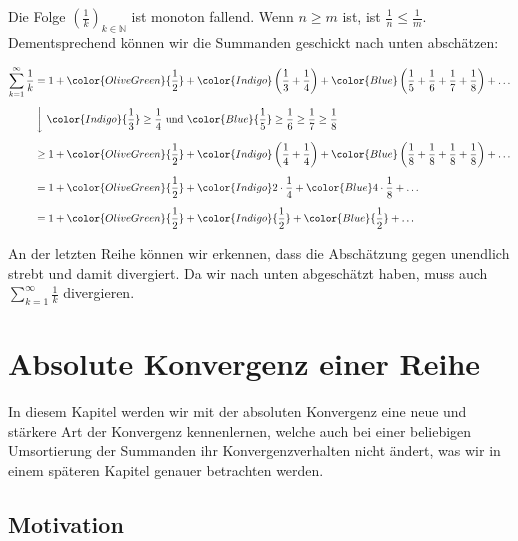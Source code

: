 \documentclass[fontsize=9pt,
               parskip=half-,
               DIV=14,
               listof=chapterentry,
               tocflat]{scrbook}
\begin{document}
\begin{solutionprocess*}
Die Folge $\left({\tfrac {1}{k}}\right)_{k\in \mathbb {N} }$ ist monoton fallend. Wenn $n\geq m$ ist, ist ${\tfrac {1}{n}}\leq {\tfrac {1}{m}}$. Dementsprechend können wir die Summanden geschickt nach unten abschätzen:

\begin{align*}
\sum _{k=1}^{\infty }{\frac {1}{k}}&=1+{\color {OliveGreen}{\frac {1}{2}}}+{\color {Indigo}\left({\frac {1}{3}}+{\frac {1}{4}}\right)}+{\color {Blue}\left({\frac {1}{5}}+{\frac {1}{6}}+{\frac {1}{7}}+{\frac {1}{8}}\right)}+\ldots \\[0.5em]&\left\downarrow \ {\color {Indigo}{\frac {1}{3}}\geq {\frac {1}{4}}}{\text{ und }}{\color {Blue}{\frac {1}{5}}\geq {\frac {1}{6}}\geq {\frac {1}{7}}\geq {\frac {1}{8}}}\right.\\[0.5em]&\geq 1+{\color {OliveGreen}{\frac {1}{2}}}+{\color {Indigo}\left({\frac {1}{4}}+{\frac {1}{4}}\right)}+{\color {Blue}\left({\frac {1}{8}}+{\frac {1}{8}}+{\frac {1}{8}}+{\frac {1}{8}}\right)}+\ldots \\[0.5em]&=1+{\color {OliveGreen}{\frac {1}{2}}}+{\color {Indigo}2\cdot {\frac {1}{4}}}+{\color {Blue}4\cdot {\frac {1}{8}}}+\ldots \\[0.5em]&=1+{\color {OliveGreen}{\frac {1}{2}}}+{\color {Indigo}{\frac {1}{2}}}+{\color {Blue}{\frac {1}{2}}}+\ldots 
\end{align*}

An der letzten Reihe können wir erkennen, dass die Abschätzung gegen unendlich strebt und damit divergiert. Da wir nach unten abgeschätzt haben, muss auch $\sum _{k=1}^{\infty }{\frac {1}{k}}$ divergieren. 

\end{solutionprocess*}



\chapter{Absolute Konvergenz einer Reihe}

In diesem Kapitel werden wir mit der absoluten Konvergenz eine neue und stärkere Art der Konvergenz kennenlernen, welche auch bei einer beliebigen Umsortierung der Summanden ihr Konvergenzverhalten nicht ändert, was wir in einem späteren Kapitel genauer betrachten werden.

\section{Motivation}
\end{document}
